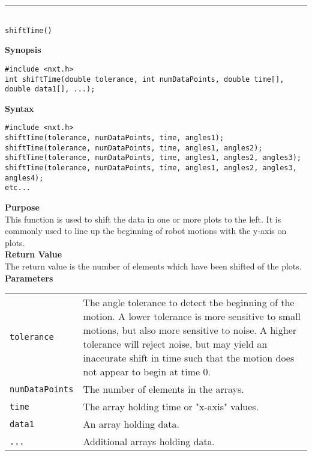 \noindent
\vspace{5pt}
\rule{4.5in}{0.015in}\\
\noindent
{\LARGE \texttt{shiftTime()}}\\
{}

\noindent
{\bf Synopsis}
\vspace{-8pt}
\begin{verbatim}
#include <nxt.h>
int shiftTime(double tolerance, int numDataPoints, double time[], double data1[], ...);
\end{verbatim}

\noindent
{\bf Syntax}
\vspace{-8pt}
\begin{verbatim}
#include <nxt.h>
shiftTime(tolerance, numDataPoints, time, angles1);
shiftTime(tolerance, numDataPoints, time, angles1, angles2);
shiftTime(tolerance, numDataPoints, time, angles1, angles2, angles3);
shiftTime(tolerance, numDataPoints, time, angles1, angles2, angles3, angles4);
etc...
\end{verbatim}

\noindent
{\bf Purpose}\\
This function is used to shift the data in one or more plots to the left. It is commonly used to
line up the beginning of robot motions with the y-axis on plots.\\

\noindent
{\bf Return Value}\\
The return value is the number of elements which have been shifted of the plots. \\

\noindent
{\bf Parameters}
\vspace{-0.1in}
\begin{description}
\item               
\begin{tabular}{p{25 mm}p{145 mm}}
\texttt{tolerance} & The angle tolerance to detect the beginning of the motion. A lower tolerance
is more sensitive to small motions, but also more sensitive to noise. A higher tolerance will
reject noise, but may yield an inaccurate shift in time such that the motion does not appear to
begin at time 0. \\
\texttt{numDataPoints} & The number of elements in the arrays. \\
\texttt{time} & The array holding time or "x-axis" values. \\
\texttt{data1} & An array holding data. \\
\texttt{...} & Additional arrays holding data. 
\end{tabular}
\end{description}

